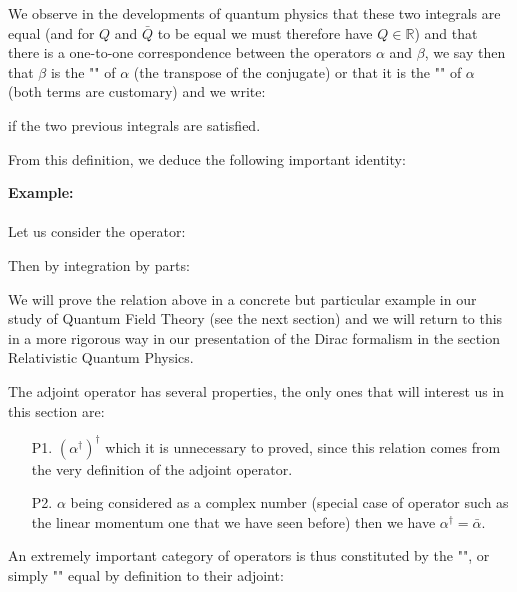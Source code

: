 	We observe in the developments of quantum physics that these two integrals are equal (and for $Q$ and $\bar{Q}$ to be equal we must therefore have $Q\in\mathbb{R}$) and that there is a one-to-one correspondence between the operators $\alpha$ and $\beta$, we say then that $\beta$ is the "" of $\alpha$ (the transpose of the conjugate) or that it is the "" of $\alpha$ (both terms are customary) and we write:
	
	if the two previous integrals are satisfied.

	From this definition, we deduce the following important identity:
	
	\begin{tcolorbox}[colframe=black,colback=white,sharp corners]
	\textbf{{\Large {}}Example:}\\\\
	Let us consider the operator:
	
	Then by integration by parts:
	
	\end{tcolorbox}
	\begin{tcolorbox}[title=Remark,colframe=black,arc=10pt]
	We will prove the relation above in a concrete but particular example in our study of Quantum Field Theory (see the next section) and we will return to this in a more rigorous way in our presentation of the Dirac formalism in the section Relativistic Quantum Physics.
	\end{tcolorbox}
	
	The adjoint operator has several properties, the only ones that will interest us in this section are:
	\begin{enumerate}
		\item[P1.] $(\alpha^\dagger)^\dagger$ which it is unnecessary to proved, since this relation comes from the very definition of the adjoint operator.
	
		\item[P2.] $\alpha$ being considered as a complex number (special case of operator such as the linear momentum one that we have seen before) then we have $\alpha^\dagger=\bar{\alpha}$.
	\end{enumerate}
	An extremely important category of operators is thus constituted by the "", or simply "" equal by definition to their adjoint:
	
